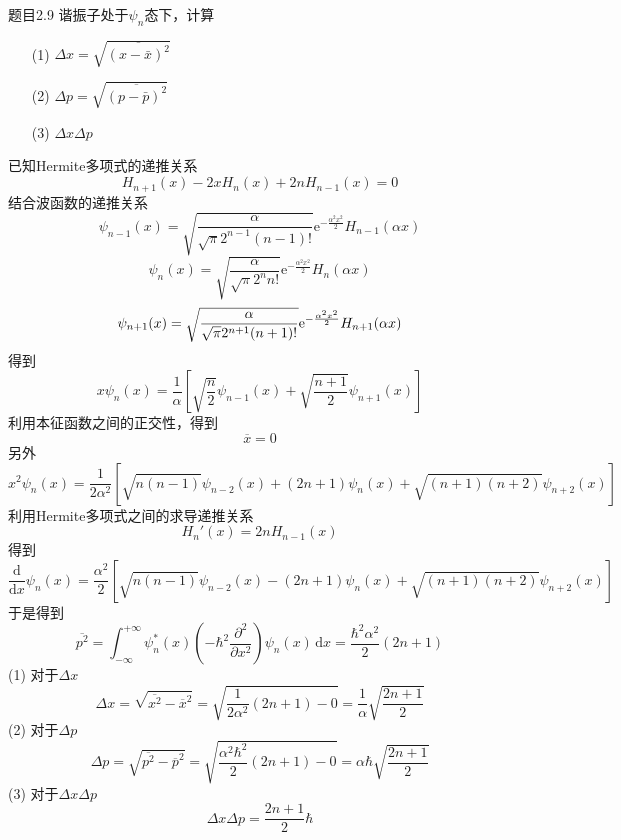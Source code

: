 \begin{question}{题目2.9}
    谐振子处于$\psi_n$态下，计算
    \begin{enumerate}
        \item[(1)] $\Delta{x}=\sqrt{\overline{(x-\bar{x})^2}}$
        \item[(2)] $\Delta{p}=\sqrt{\overline{(p-\bar{p})^2}}$
        \item[(3)] $\Delta{x}\Delta{p}$
    \end{enumerate}
\end{question}
\begin{solution}
    已知Hermite多项式的递推关系
    $$
        H_{n+1}(x)-2xH_n(x)+2nH_{n-1}(x)=0
    $$
    结合波函数的递推关系
    $$
        \psi_{n-1}(x)=\sqrt{\frac{\alpha}{\sqrt{\pi}2^{n-1}(n-1)!}}\mathrm{e}^{-\frac{\alpha^2x^2}{2}}H_{n-1}(\alpha x)
    $$
    $$
        \psi_n(x)=\sqrt{\frac{\alpha}{\sqrt{\pi}2^nn!}}\mathrm{e}^{-\frac{\alpha^2x^2}{2}}H_n(\alpha x)
    $$
    $$
        \psi_{n+1}(x)=\sqrt{\frac{\alpha}{\sqrt{\pi}2^{n+1}(n+1)!}}\mathrm{e}^{-\frac{\alpha^2x^2}{2}}H_{n+1}(\alpha x) \\
    $$
    得到
    $$
        x\psi_n(x)=\frac{1}{\alpha}\left[\sqrt{\frac{n}{2}}\psi_{n-1}(x)+\sqrt{\frac{n+1}{2}}\psi_{n+1}(x)\right]
    $$
    利用本征函数之间的正交性，得到
    $$
        \overline{x}=0
    $$
    另外
    $$
        x^2\psi_n(x) = \frac{1}{2\alpha^2}\left[\sqrt{n(n-1)}\psi_{n-2}(x)+(2n+1)\psi_n(x)+\sqrt{(n+1)(n+2)}\psi_{n+2}(x)\right]
    $$
    利用Hermite多项式之间的求导递推关系
    $$
        H_n'(x) = 2nH_{n-1}(x)
    $$
    得到
    $$
        \frac{\mathrm{d}}{\mathrm{d}x}\psi_n(x)=\frac{\alpha^2}{2}\left[\sqrt{n(n-1)}\psi_{n-2}(x) - (2n+1)\psi_n(x) + \sqrt{(n+1)(n+2)}\psi_{n+2}(x)\right]
    $$
    于是得到
    $$
        \overline{p^2}=\int_{-\infty}^{+\infty}\psi_n^*(x)\left(-\hbar^2\frac{\partial^2}{\partial x^2}\right)\psi_n(x)\,\mathrm{d}x
        =\frac{\hbar^2\alpha^2}{2}(2n+1)
    $$
    (1) 对于$\Delta{x}$
    $$
        \Delta{x}=\sqrt{\overline{x^2}-\overline{x}^2}
        =\sqrt{\frac{1}{2\alpha^2}(2n+1)-0}
        =\frac{1}{\alpha}\sqrt{\frac{2n+1}{2}}
    $$
    (2) 对于$\Delta{p}$
    $$
        \Delta{p}=\sqrt{\overline{p^2}-\overline{p}^2}
        =\sqrt{\frac{\alpha^2\hbar^2}{2}(2n+1)-0}
        =\alpha\hbar\sqrt{\frac{2n+1}{2}}
    $$
    (3) 对于$\Delta{x}\Delta{p}$
    $$
        \Delta{x}\Delta{p}=\frac{2n+1}{2}\hbar
    $$
\end{solution}



